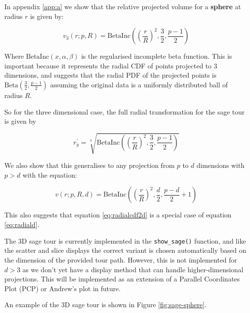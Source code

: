 In appendix \ref{app:a} we show that the relative projected volume for a \textbf{sphere} at radius \(r\) is given by:

\begin{equation}
  v_3(r; p, R) = \mathrm{BetaInc}\left(\left(\frac{r}{R}\right)^2, \frac{3}{2}, \frac{p-1}{2}\right) 
\end{equation}

Where \(\mathrm{BetaInc}(x, \alpha, \beta)\) is the regularised incomplete beta function. This is important because it represents the radial CDF of points projected to 3 dimensions, and suggests that the radial PDF of the projected points is \(\mathrm{Beta}\left(\frac{3}{2}, \frac{p-1}{2}\right)\) assuming the original data is a uniformly distributed ball of radius \(R\).

So for the three dimensional case, the full radial transformation for the sage tour is given by

\begin{equation}
r_y^\prime = \sqrt[3]{\mathrm{BetaInc}\left(\left(\frac{r}{R}\right)^2, \frac{3}{2}, \frac{p-1}{2}\right)}
\label{eq:radial3}
\end{equation}

We also show that this generalises to any projection from \(p\) to \(d\) dimensions with \(p>d\) with the equation:

\begin{equation}
v(r; p, R, d) = \mathrm{BetaInc}\left(\left(\frac{r}{R}\right)^2, \frac{d}{2}, \frac{p-d}{2}+1\right)
\label{eq:radiald}
\end{equation}

This also suggests that equation \eqref{eq:radialcdf2d} is a special case of equation \eqref{eq:radiald}.

The 3D sage tour is currently implemented in the \texttt{show\_sage()} function, and like the scatter and slice displays the correct variant is chosen automatically based on the dimension of the provided tour path. However, this is not implemented for \(d>3\) as we don't yet have a display method that can handle higher-dimensional projections. This will be implemented as an extension of a Parallel Coordinates Plot (PCP) or Andrew's plot in future.

An example of the 3D sage tour is shown in Figure \ref{fig:sage-sphere}.

